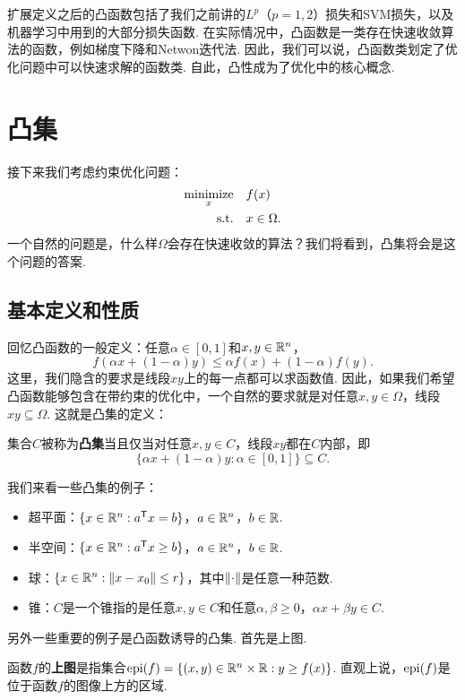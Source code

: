 扩展定义之后的凸函数包括了我们之前讲的$L^p$（$p=1,2$）损失和SVM损失，以及机器学习中用到的大部分损失函数. 在实际情况中，凸函数是一类存在快速收敛算法的函数，例如梯度下降和Netwon迭代法. 因此，我们可以说，凸函数类划定了优化问题中可以快速求解的函数类. 自此，凸性成为了优化中的核心概念. 

\section{凸集}
接下来我们考虑约束优化问题：
\begin{align*}
    \operatorname*{minimize}_x &\quad f(x)\\
    \text{s.t.}&\quad x\in \Omega.
\end{align*}
一个自然的问题是，什么样$\Omega$会存在快速收敛的算法？我们将看到，凸集将会是这个问题的答案.

\subsection{基本定义和性质}
回忆凸函数的一般定义：任意$\alpha\in[0,1]$和$x,y\in\mathbb{R}^n$，
    \[
        f(\alpha x+(1-\alpha) y)\leq \alpha f(x)+(1-\alpha) f(y).
    \]
这里，我们隐含的要求是线段$xy$上的每一点都可以求函数值. 因此，如果我们希望凸函数能够包含在带约束的优化中，一个自然的要求就是对任意$x,y\in \Omega$，线段$xy\subseteq \Omega$. 这就是凸集的定义：

\begin{definition}[凸集]
集合$C$被称为\textbf{凸集}当且仅当对任意$x,y\in C$，线段$xy$都在$C$内部，即
\[\{\alpha x+(1-\alpha)y:\alpha\in [0,1]\}\subseteq C.\]
\end{definition}

我们来看一些凸集的例子：
\begin{example}
\begin{itemize}
    \item 超平面：$\{x\in\mathbb{R}^n:a^{\mathsf{T}} x= b\}$，$a\in\mathbb{R}^n$，$b\in\mathbb{R}$. 
    \item 半空间：$\{x\in\mathbb{R}^n:a^{\mathsf{T}} x\geq b\}$，$a\in\mathbb{R}^n$，$b\in\mathbb{R}$. 
    \item 球：$\{x\in\mathbb{R}^n:\left\|x-x_0\right\|\leq r\}$，其中$\left\|\cdot\right\|$是任意一种范数. 
    \item 锥：$C$是一个锥指的是任意$x,y\in C$和任意$\alpha,\beta\geq 0$，$\alpha x+\beta y\in C$. 
\end{itemize}
\end{example}

另外一些重要的例子是凸函数诱导的凸集. 首先是上图. 

\begin{definition}[上图]
    函数$f$的\textbf{上图}是指集合$\operatorname*{epi}(f)=\{(x,y)\in\mathbb{R}^{n}\times\mathbb{R}:y\geq f(x)\}$. 直观上说，$\operatorname*{epi}(f)$是位于函数$f$的图像上方的区域.
\end{definition}

